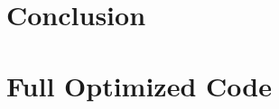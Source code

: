 \documentclass[11pt]{article}
\begin{document}



    \section{Conclusion}\label{sec:conclusion}

    \pagebreak

    \appendix
    \section{Full Optimized Code}\label{sec:full-optimized-code}
\end{document}
